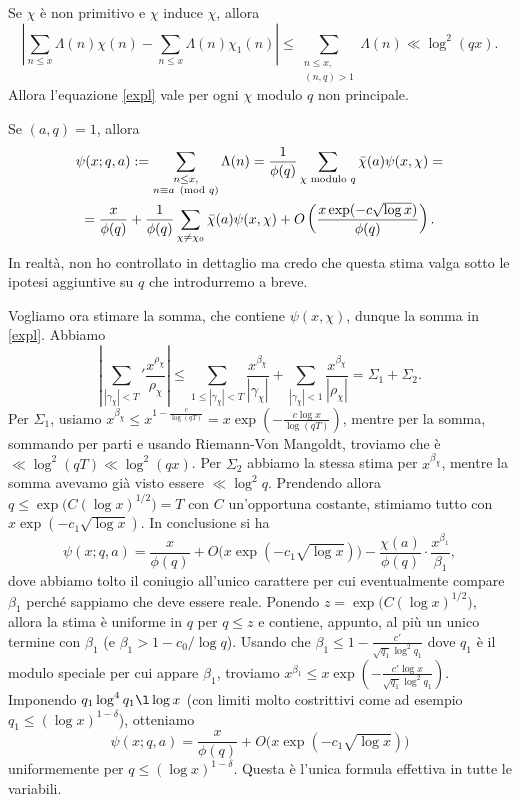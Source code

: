 \begin{oss}
  Se $\chi$ è non primitivo e $\chi$ induce $\chi$, allora
  $$\left| \sum_{n \le x} \Lambda(n)\chi(n)-\sum_{n \le x}\Lambda(n)\chi_1(n)\right| \le \sum_{\substack{n \le x,\\ (n,q)>1}} \Lambda(n) \ll \log^2(qx).$$
  Allora l'equazione \eqref{expl} vale per ogni $\chi$ modulo $q$ non principale.
\end{oss}

\begin{cor}
  Se $(a,q)=1$, allora
  \begin{gather*}
    \psi(x;q,a):=\sum_{\substack{n \le x,\\ n \equiv a \pmod{q}}} \Lambda(n)=\frac{1}{\phi(q)} \sum_{\chi\textnormal{ modulo }q} \bar{\chi}(a)\psi(x,\chi)= \\
    =\frac{x}{\phi(q)}+\frac{1}{\phi(q)}\sum_{\chi\not=\chi_0} \bar{\chi}(a)\psi(x,\chi)+O\left(\frac{x\exp(-c\sqrt{\log x})}{\phi(q)}\right).
  \end{gather*}
  In realtà, non ho controllato in dettaglio ma credo che questa stima valga sotto le ipotesi aggiuntive su $q$ che introdurremo a breve.
\end{cor}

Vogliamo ora stimare la somma, che contiene $\psi(x,\chi)$, dunque la somma in \eqref{expl}. Abbiamo
$$\left|\sum_{|\gamma_\chi|<T}' \frac{x^{\rho_\chi}}{\rho_\chi}\right| \le \sum_{1 \le |\gamma_\chi|<T} \frac{x^{\beta_\chi}}{|\gamma_\chi|}+\sum_{|\gamma_\chi| < 1} \frac{x^{\beta_\chi}}{|\rho_\chi|}=\Sigma_1+\Sigma_2.$$
Per $\Sigma_1$, usiamo $x^{\beta_\chi} \le x^{1-\frac{c}{\log(qT)}}=x\exp\left(-\frac{c\log{x}}{\log(qT)}\right)$, mentre per la somma, sommando per parti e usando Riemann-Von Mangoldt, troviamo che è $\ll \log^2(qT) \ll \log^2(qx)$. Per $\Sigma_2$ abbiamo la stessa stima per $x^{\beta_\chi}$, mentre la somma avevamo già visto essere $\ll \log^2{q}$.
Prendendo allora $q \le \exp\big(C(\log{x})^{1/2}\big)=T$ con $C$ un'opportuna costante, stimiamo tutto con $x\exp(-c_1\sqrt{\log{x}})$. In conclusione si ha
$$\psi(x;q,a)=\frac{x}{\phi(q)}+O\big(x\exp(-c_1\sqrt{\log{x}})\big)-\frac{\chi(a)}{\phi(q)}\cdot\frac{x^{\beta_1}}{\beta_1},$$
dove abbiamo tolto il coniugio all'unico carattere per cui eventualmente compare $\beta_1$ perché sappiamo che deve essere reale. Ponendo $z=\exp\big(C(\log{x})^{1/2}\big)$, allora la stima è uniforme in $q$ per $q \le z$ e contiene, appunto, al più un unico termine con $\beta_1$ (e $\beta_1>1-c_0/\log{q}$).
Usando che $\beta_1 \le 1-\frac{c'}{\sqrt{q_1}\log^2{q_1}}$ dove $q_1$ è il modulo speciale per cui appare $\beta_1$, troviamo $x^{\beta_1} \le x\exp\left(-\frac{c'\log{x}}{\sqrt{q_1}\log^2{q_1}}\right)$.
Imponendo $q_1\log^4{q_1} \l \log{x}$ (con limiti molto costrittivi come ad esempio $q_1 \le (\log{x})^{1-\delta}$), otteniamo
$$\psi(x;q,a)=\frac{x}{\phi(q)}+O\big(x\exp(-c_1\sqrt{\log{x}})\big)$$
uniformemente per $q \le (\log{x})^{1-\delta}$. Questa è l'unica formula effettiva in tutte le variabili.

